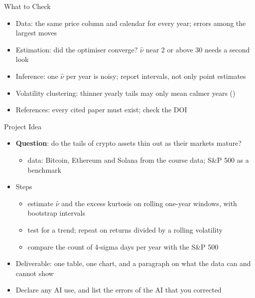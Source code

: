 \begin{frame}{What to Check}
\itemsize{\small}
\begin{itemize}
    \item Data: the same price column and calendar for every year; errors among the largest moves
    \item Estimation: did the optimiser converge? $\hat\nu$ near 2 or above 30 needs a second look
    \item Inference: one $\hat\nu$ per year is noisy; report intervals, not only point estimates
    \item Volatility clustering: thinner yearly tails may only mean calmer years ()
    \item References: every cited paper must exist; check the DOI
\end{itemize}
\end{frame}

\begin{frame}{Project Idea}
\itemsize{\small}
\begin{itemize}
    \item \textbf{Question}: do the tails of crypto assets thin out as their markets mature?
    \begin{itemize}
        \item data: Bitcoin, Ethereum and Solana from the course data; S\&P 500 as a benchmark
    \end{itemize}
    \item Steps
    \begin{itemize}
        \item estimate $\hat\nu$ and the excess kurtosis on rolling one-year windows, with bootstrap intervals
        \item test for a trend; repeat on returns divided by a rolling volatility
        \item compare the count of 4-sigma days per year with the S\&P 500
    \end{itemize}
    \item Deliverable: one table, one chart, and a paragraph on what the data can and cannot show
    \item Declare any AI use, and list the errors of the AI that you corrected
\end{itemize}
\end{frame}



